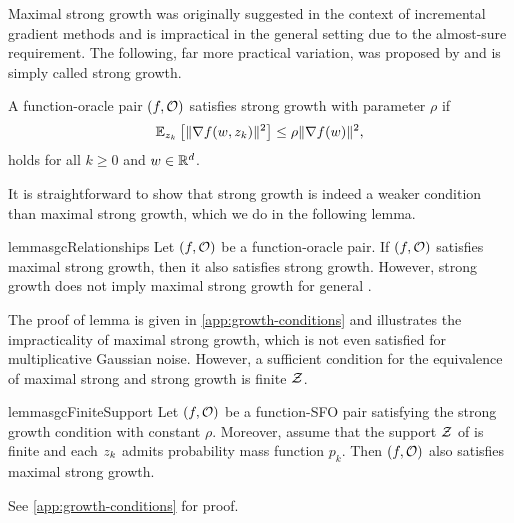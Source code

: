 Maximal strong growth was originally suggested in the context of incremental gradient methods and is impractical in the general setting due to the almost-sure requirement.
The following, far more practical variation, was proposed by \citet{vaswani2019fast} and is simply called strong growth.
\begin{definition}\label{def:sgc}
    A function-oracle pair \( \rbr{f, \oracle{}} \) satisfies strong growth with parameter \(\rho \) if
    \[ \Ek \sbr{\norm{\grad(\w, \zk)}^2} \leq \rho \norm{\grad(\w)}^2, \]
    holds for all \( k \geq 0 \) and \( \w \in \R^d \).
\end{definition}
\noindent It is straightforward to show that strong growth is indeed a weaker condition than maximal strong growth, which we do in the following lemma.
\begin{restatable}{lemma}{sgcRelationships}\label{thm:sgc-relationships}
    Let \( \rbr{f, \oracle{}} \) be a function-oracle pair. 
    If \( \rbr{f, \oracle{}} \) satisfies maximal strong growth, then it also satisfies strong growth.
    However, strong growth does not imply maximal strong growth for general \oracle{}.  
\end{restatable} 
\noindent The proof of lemma is given in \autoref{app:growth-conditions} and illustrates the impracticality of maximal strong growth, which is not even satisfied for multiplicative Gaussian noise.
However, a sufficient condition for the equivalence of maximal strong and strong growth is finite \( \calZ \).
\begin{restatable}{lemma}{sgcFiniteSupport}\label{lemma:sgc-finite-support}
    Let \( \rbr{f, \oracle{}} \) be a function-\ac{SFO} pair satisfying the strong growth condition with constant \( \rho \).
    Moreover, assume that the support \( \calZ \) of \oracle{} is finite and each \( \zk \) admits probability mass function \( p_k \). 
    Then \( \rbr{f, \oracle{}} \) also satisfies maximal strong growth.
\end{restatable}
\noindent See \autoref{app:growth-conditions} for proof.\hfill \break

